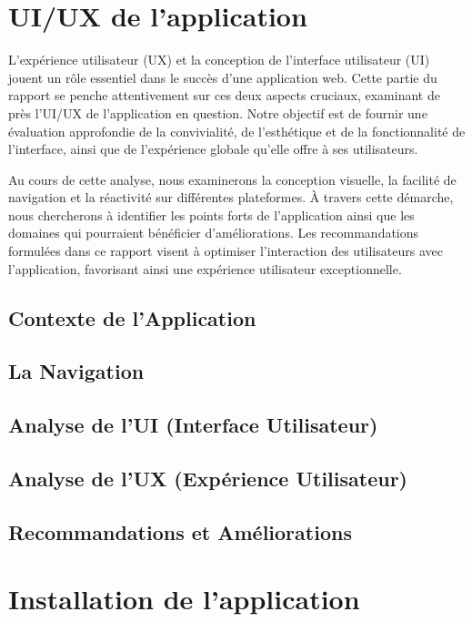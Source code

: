 \documentclass[12pt, a4paper, oneside]{Thesis}
\begin{document}
\newpage

\newpage

\section{UI/UX de l'application}
L'expérience utilisateur (UX) et la conception de l'interface utilisateur (UI) jouent un rôle essentiel dans le succès d'une application web. Cette partie du rapport se penche attentivement sur ces deux aspects cruciaux, examinant de près l'UI/UX de l'application en question. Notre objectif est de fournir une évaluation approfondie de la convivialité, de l'esthétique et de la fonctionnalité de l'interface, ainsi que de l'expérience globale qu'elle offre à ses utilisateurs.

Au cours de cette analyse, nous examinerons la conception visuelle, la facilité de navigation et la réactivité sur différentes plateformes. À travers cette démarche, nous chercherons à identifier les points forts de l'application ainsi que les domaines qui pourraient bénéficier d'améliorations. Les recommandations formulées dans ce rapport visent à optimiser l'interaction des utilisateurs avec l'application, favorisant ainsi une expérience utilisateur exceptionnelle.




\subsection{Contexte de l'Application}
\subsection{La Navigation}
\subsection{Analyse de l'UI (Interface Utilisateur)}
\subsection{Analyse de l'UX (Expérience Utilisateur)}
\subsection{Recommandations et Améliorations}





\newpage

\section{Installation de l'application}
\end{document}

